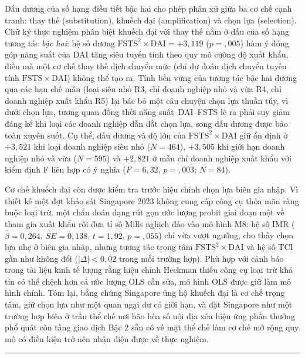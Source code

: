 \documentclass[
  a4paper,
  13pt]{extreport}
\begin{document}
Dấu dương của số hạng điều tiết bậc hai cho phép phân xử giữa ba cơ chế
cạnh tranh: thay thế (substitution), khuếch đại (amplification) và chọn
lựa (selection). Chữ ký thực nghiệm phân biệt khuếch đại với thay thế
nằm ở dấu của số hạng tương tác \emph{bậc hai}: hệ số dương
\(\mathrm{FSTS}^2 \times \mathrm{DAI} = +3{,}119\) (\(p = {,}005\)) hàm
ý đóng góp năng suất của DAI tăng siêu tuyến tính theo quy mô cường độ
xuất khẩu, điều mà một cơ chế thay thế dịch chuyển mức (chỉ dự đoán dịch
chuyển tuyến tính \(\mathrm{FSTS} \times \mathrm{DAI}\)) không thể tạo
ra. Tính bền vững của tương tác bậc hai dương qua các hạn chế mẫu (loại
siêu nhỏ R3, chỉ doanh nghiệp nhỏ và vừa R4, chỉ doanh nghiệp xuất khẩu
R5) lại bác bỏ một câu chuyện chọn lựa thuần túy, vì dưới chọn lựa,
tương quan đồng thời năng suất--DAI--FSTS lẽ ra phải suy giảm đáng kể
khi loại các doanh nghiệp dẫn dắt chọn lựa, song dấu dương được bảo toàn
xuyên suốt. Cụ thể, dấu dương và độ lớn của
\(\mathrm{FSTS}^2 \times \mathrm{DAI}\) giữ ổn định ở \(+3{,}521\) khi
loại doanh nghiệp siêu nhỏ (\(N = 464\)), \(+3{,}505\) khi giới hạn
doanh nghiệp nhỏ và vừa (\(N = 595\)) và \(+2{,}821\) ở mẫu chỉ doanh
nghiệp xuất khẩu với kiểm định F liên hợp có ý nghĩa (\(F = 6{,}32\),
\(p = {,}003\); \(N = 84\)).

Cơ chế khuếch đại còn được kiểm tra trước hiệu chỉnh chọn lựa biên gia
nhập. Vì thiết kế một đợt khảo sát Singapore 2023 không cung cấp công cụ
thỏa mãn ràng buộc loại trừ, một chẩn đoán dạng rút gọn ước lượng probit
giai đoạn một về tham gia xuất khẩu rồi đưa tỉ số Mills nghịch đảo vào
mô hình M8: hệ số IMR (\(\hat{\beta} = 0{,}264\), \(SE = 0{,}138\),
\(t = 1{,}92\), \(p = {,}055\)) chỉ vừa vượt ngưỡng, cho thấy chọn lựa
nhẹ ở biên gia nhập, nhưng tương tác trọng tâm
\(\mathrm{FSTS}^2 \times \mathrm{DAI}\) và hệ số TCI gần như không đổi
(\(|\Delta| < 0{,}02\) trong mỗi trường hợp). Phù hợp với cảnh báo trong
tài liệu kinh tế lượng rằng hiệu chỉnh Heckman thiếu công cụ loại trừ
khả tín có thể chệch hơn cả ước lượng OLS cần sửa, mô hình OLS được giữ
làm mô hình chính. Tóm lại, bằng chứng Singapore ủng hộ khuếch đại là cơ
chế trọng tâm, giữ chọn lựa như một quan ngại dư có giới hạn, và đặt
Singapore như một trường hợp biên ở trần thể chế nơi bão hòa số nội địa
xóa hiệu ứng phần thưởng phổ quát còn tầng giao dịch Bậc 2 sẵn có về mặt
thể chế làm cơ chế mở rộng quy mô có điều kiện trở nên nhận diện được về
thực nghiệm.

\begin{center}\rule{0.5\linewidth}{0.5pt}\end{center}
\end{document}
